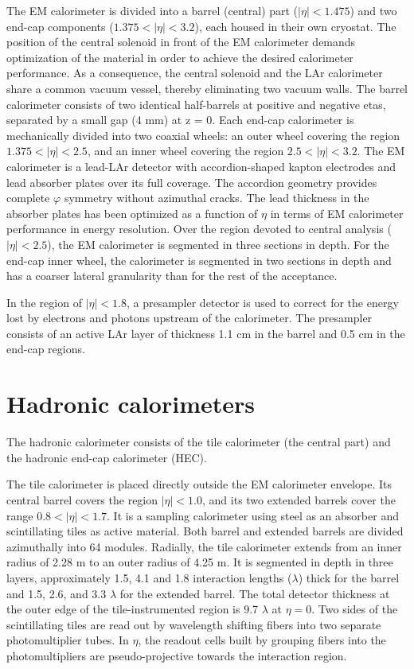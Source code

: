 The EM calorimeter is divided into a barrel (central) part ($|\eta| < 1.475$) and two end-cap components
($1.375 < |\eta| < 3.2$), each housed in their own cryostat. The position of the central solenoid in
front of the EM calorimeter demands optimization of the material in order to achieve the desired calorimeter
performance. As a consequence, the central solenoid and the LAr calorimeter
share a common vacuum vessel, thereby eliminating two vacuum walls. The barrel calorimeter
consists of two identical half-barrels at positive and negative etas, separated by a small gap (4 mm) at z = 0. Each end-cap
calorimeter is mechanically divided into two coaxial wheels: an outer wheel covering the region
$1.375 < |\eta| < 2.5$, and an inner wheel covering the region $2.5 < |\eta| < 3.2$. The EM calorimeter is
a lead-LAr detector with accordion-shaped kapton electrodes and lead absorber plates over its full
coverage. The accordion geometry provides complete $\varphi$ symmetry without azimuthal cracks. The lead thickness in the absorber plates has been optimized as a function of $\eta$ in terms of EM calorimeter performance in energy resolution. Over the region devoted to central analysis ($|\eta| < 2.5$), the
EM calorimeter is segmented in three sections in depth. For the end-cap inner wheel, the calorimeter is segmented in two sections in depth and has a coarser lateral granularity than for the rest of the acceptance.

In the region of $|\eta| < 1.8$, a presampler detector is used to correct for the energy lost by
electrons and photons upstream of the calorimeter. The presampler consists of an active LAr layer
of thickness 1.1 cm in the barrel and 0.5 cm in the end-cap regions.


\section{Hadronic calorimeters}
\label{sec:ATLAS_H_calo}


The hadronic calorimeter consists of the tile calorimeter (the central part) and the hadronic end-cap calorimeter (HEC).

The tile calorimeter is placed directly outside the EM calorimeter envelope. Its
central barrel covers the region $|\eta| < 1.0$, and its two extended barrels cover the range $0.8 < |\eta| < 1.7$. It is a
sampling calorimeter using steel as an absorber and scintillating tiles as active material. Both
barrel and extended barrels are divided azimuthally into 64 modules. Radially, the tile calorimeter
extends from an inner radius of 2.28 m to an outer radius of 4.25 m. It is segmented in depth in three
layers, approximately 1.5, 4.1 and 1.8 interaction lengths ($\lambda$) thick for the barrel and 1.5, 2.6, and
3.3 $\lambda$ for the extended barrel. The total detector thickness at the outer edge of the tile-instrumented
region is 9.7 $\lambda$ at $\eta=0$. Two sides of the scintillating tiles are read out by wavelength shifting
fibers into two separate photomultiplier tubes. In $\eta$, the readout cells built by grouping fibers into
the photomultipliers are pseudo-projective towards the interaction region.

